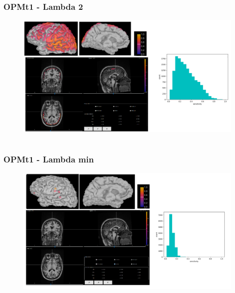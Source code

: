 \documentclass{beamer}
\numberwithin{figure}{section}
\numberwithin{equation}{section}
\begin{document}
\section{}
\begin{frame}
 \frametitle{OPMt1 - Lambda 2}
	\begin{figure}[p]
  		\centering
  		\includegraphics[width=1\linewidth]{pictures/opmt111}
  		\label{fig:approaches_RDF}
 	\end{figure}

  
\end{frame}
\section{}
\begin{frame}
 \frametitle{OPMt1 - Lambda min}
	\begin{figure}[p]
  		\centering
  		\includegraphics[width=1\linewidth]{pictures/opmt122}
  		\label{fig:approaches_RDF}
 	\end{figure}

  
\end{frame}
\end{document}

